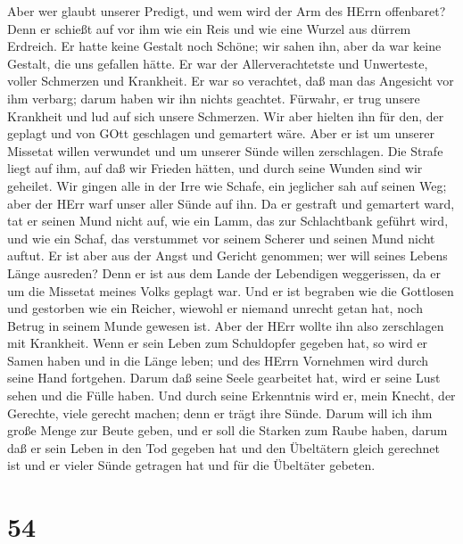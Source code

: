  Aber wer glaubt unserer Predigt, und wem wird der Arm des
HErrn offenbaret?  Denn er schießt auf vor ihm wie ein Reis
und wie eine Wurzel aus dürrem Erdreich. Er hatte keine Gestalt noch
Schöne; wir sahen ihn, aber da war keine Gestalt, die uns gefallen
hätte.  Er war der Allerverachtetste und Unwerteste, voller
Schmerzen und Krankheit. Er war so verachtet, daß man das Angesicht vor
ihm verbarg; darum haben wir ihn nichts geachtet.  Fürwahr,
er trug unsere Krankheit und lud auf sich unsere Schmerzen. Wir aber
hielten ihn für den, der geplagt und von GOtt geschlagen und gemartert
wäre.  Aber er ist um unserer Missetat willen verwundet und
um unserer Sünde willen zerschlagen. Die Strafe liegt auf ihm, auf daß
wir Frieden hätten, und durch seine Wunden sind wir geheilet.
 Wir gingen alle in der Irre wie Schafe, ein jeglicher sah
auf seinen Weg; aber der HErr warf unser aller Sünde auf ihn.
 Da er gestraft und gemartert ward, tat er seinen Mund nicht
auf, wie ein Lamm, das zur Schlachtbank geführt wird, und wie ein Schaf,
das verstummet vor seinem Scherer und seinen Mund nicht auftut.
 Er ist aber aus der Angst und Gericht genommen; wer will
seines Lebens Länge ausreden? Denn er ist aus dem Lande der Lebendigen
weggerissen, da er um die Missetat meines Volks geplagt war.
 Und er ist begraben wie die Gottlosen und gestorben wie ein
Reicher, wiewohl er niemand unrecht getan hat, noch Betrug in seinem
Munde gewesen ist.  Aber der HErr wollte ihn also
zerschlagen mit Krankheit. Wenn er sein Leben zum Schuldopfer gegeben
hat, so wird er Samen haben und in die Länge leben; und des HErrn
Vornehmen wird durch seine Hand fortgehen.  Darum daß seine
Seele gearbeitet hat, wird er seine Lust sehen und die Fülle haben. Und
durch seine Erkenntnis wird er, mein Knecht, der Gerechte, viele gerecht
machen; denn er trägt ihre Sünde.  Darum will ich ihm große
Menge zur Beute geben, und er soll die Starken zum Raube haben, darum
daß er sein Leben in den Tod gegeben hat und den Übeltätern gleich
gerechnet ist und er vieler Sünde getragen hat und für die Übeltäter
gebeten.

\hypertarget{section-53}{%
\section{54}\label{section-53}}

